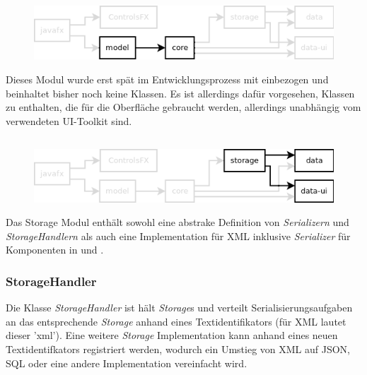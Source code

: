 \subsection{\textModModel}
\label{\textModModel}
\begin{figure}[h!]
	\centering
	\includegraphics[width=.8\textwidth]{module_dependencies_model.png}
\end{figure}

Dieses Modul wurde erst spät im Entwicklungsprozess mit einbezogen und beinhaltet bisher noch keine Klassen.
Es ist allerdings dafür vorgesehen, Klassen zu enthalten, die für die Oberfläche gebraucht werden, allerdings
unabhängig vom verwendeten UI-Toolkit sind.

\subsection{\textModStorage}
\label{\textModStorage}
\begin{figure}[h!]
	\centering
	\includegraphics[width=.8\textwidth]{module_dependencies_storage.png}
\end{figure}

Das Storage Modul enthält sowohl eine abstrake Definition von \textit{Serializern} und \textit{StorageHandlern}
als auch eine Implementation für XML inklusive \textit{Serializer} für Komponenten in  und
.

\subsubsection{StorageHandler}
Die Klasse \textit{StorageHandler} ist hält \textit{Storage}s und verteilt Serialisierungsaufgaben an
das entsprechende \textit{Storage} anhand eines Textidentifikators (für XML lautet dieser 'xml').
Eine weitere \textit{Storage} Implementation kann anhand eines neuen Textidentifkators registriert werden,
wodurch ein Umstieg von XML auf JSON, SQL oder eine andere Implementation vereinfacht wird.

